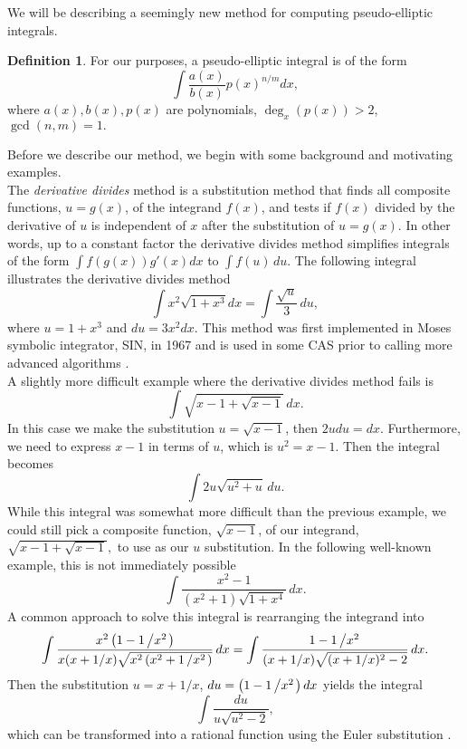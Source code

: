 \documentclass[12pt]{article}
\numberwithin{equation}{section}
\def\todo#1{\textcolor{red}{\textbf{**** TODO -- #1 ****}}}
\theoremstyle{definition}
\newtheorem{definition}{Definition}
\begin{document}


We will be describing a seemingly new method for computing pseudo-elliptic integrals. 
\begin{definition}
For our purposes, a pseudo-elliptic integral is of the form 
$$\int \frac{a(x)}{b(x)}p(x)^{n/m}dx,$$
where $a(x),b(x),p(x)$ are polynomials, $\deg_x(p(x))>2$, $\gcd(n,m)=1.$
\end{definition} 

Before we describe our method, we begin with some background and motivating examples. \\

The \textit{derivative divides} method is a substitution method that finds all composite 
functions, $u=g(x)$, of the integrand $f(x)$, and tests if $f(x)$ divided by the derivative of 
$u$ is independent of $x$ after the substitution of $u=g(x)$. In other words, up to a constant
factor the derivative divides method simplifies integrals of the form $\int f(g(x))g'(x)dx$ to 
$\int f(u) \, du$. The following integral illustrates the derivative divides method 
$$\int x^2\sqrt{1+x^3}dx=\int \frac{\sqrt{u}}{3} \, du,$$ 
where $u=1+x^3$ and $du=3x^2dx$. This method was first implemented in Moses symbolic integrator, 
SIN, in 1967 \cite{Moses1967} and is used in some CAS prior to calling more advanced 
algorithms \cite[pp. 473-474]{Geddes1992}.\\

A slightly more difficult example where the derivative divides method fails is 
$$\int \sqrt{x-1+\sqrt{x-1}} \, dx.$$
In this case we make the substitution $u=\sqrt{x-1}$, then $2udu=dx$. Furthermore, we need to 
express $x-1$ in terms of $u$, which is $u^2=x-1$. Then the integral becomes
$$\int 2u\sqrt{u^2+u}\,du.$$
While this integral was somewhat more difficult than the previous example, we could still 
pick a composite function, $\sqrt{x-1}$, of our integrand, $\sqrt{x-1+\sqrt{x-1}},$ to use 
as our $u$ substitution. In the following well-known example, this is not immediately possible
$$\int \frac{x^2-1}{\left(x^2+1\right)\sqrt{1+x^4}} \, dx.$$
A common approach to solve this integral is rearranging the integrand into
$$\int \frac{x^2\left(1-1\left/x^2\right.\right)}{x(x+1/x)\sqrt{x^2\left(x^2+1\left/x^2\right.\right)}} \, dx = 
\int \frac{1-1\left/x^2\right.}{(x+1/x)\sqrt{(x+1/x)^2-2}} \, dx. $$ 
Then the substitution $u=x+1/x$, $du=\left(1-1\left/x^2\right.\right)dx$ yields the integral
$$\int \frac{du}{u\sqrt{u^2-2}},$$
which can be transformed into a rational function using the Euler substitution \cite{Euler}.\\
\end{document}
